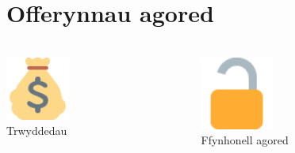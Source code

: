 \documentclass{beamer}
\begin{document}
\begin{frame}[fragile]
\begin{center}
  
\end{center}
\end{frame}

\section[]{Offerynnau agored}
\begin{frame}
\frametitle{\hfill}
\end{frame}

\begin{frame}
  \begin{columns}
    \begin{column}{0.5\textwidth}
      \begin{center}
        \includegraphics[width=0.35\textwidth]{emoji/arian}\\
        Trwyddedau
      \end{center}
    \end{column}
    \pause
    \begin{column}{0.5\textwidth}
      \begin{center}
        \includegraphics[width=0.35\textwidth]{emoji/unlock}\\
        Ffynhonell agored
      \end{center}
    \end{column}
  \end{columns}
\end{frame}
\end{document}
